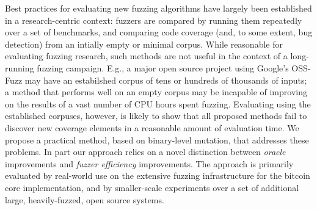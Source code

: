 Best practices for evaluating new fuzzing algorithms have largely been
established in a research-centric context:  fuzzers are compared by
running them repeatedly over a set of benchmarks, and comparing code
coverage (and, to some extent, bug detection) from an intially empty
or minimal corpus.  While reasonable for evaluating fuzzing research,
such methods are not useful in the context of a long-running fuzzing campaign.  E.g., a major open source project using Google's OSS-Fuzz may have an estabilshed corpus of tens or hundreds of thousands of inputs; a method that performs well on an empty corpus may be incapable of improving on the results of a vast number of CPU hours spent fuzzing.  Evaluating using the established corpuses, however, is likely to show that all proposed methods fail to discover new coverage elements in a reasonable amount of evaluation time.  We propose a practical method, based on binary-level mutation, that addresses these problems.  In part our approach relies on a novel distinction between \emph{oracle} improvements and \emph{fuzzer efficiency} improvements.  The approach is primarily evaluated by real-world use on the extensive fuzzing infrastructure for the bitcoin core implementation, and by smaller-scale experiments over a set of additional large, heavily-fuzzed, open source systems.